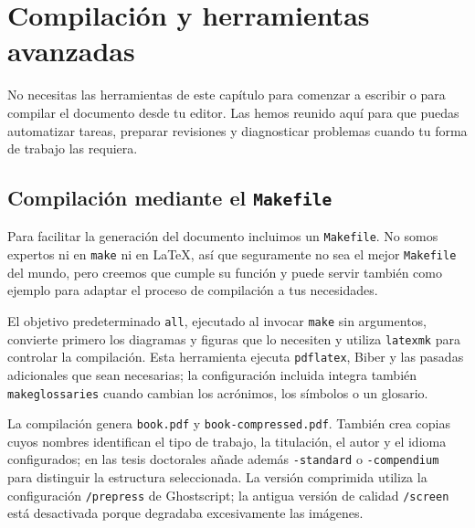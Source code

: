 %

\chapter{Compilación y herramientas avanzadas}
\label{cha:compilacion-avanzada}

No necesitas las herramientas de este capítulo para comenzar a escribir o para compilar el documento desde tu editor. Las hemos reunido aquí para que puedas automatizar tareas, preparar revisiones y diagnosticar problemas cuando tu forma de trabajo las requiera.

\section{Compilación mediante el \texttt{Makefile}}
\label{sec:compilacion-makefile}

Para facilitar la generación del documento incluimos un \texttt{Makefile}. No somos expertos ni en \texttt{make} ni en \LaTeX{}, así que seguramente no sea el mejor \texttt{Makefile} del mundo, pero creemos que cumple su función y puede servir también como ejemplo para adaptar el proceso de compilación a tus necesidades.

El objetivo predeterminado \texttt{all}, ejecutado al invocar \texttt{make} sin argumentos, convierte primero los diagramas y figuras que lo necesiten y utiliza \texttt{latexmk} para controlar la compilación. Esta herramienta ejecuta \texttt{pdflatex}, Biber y las pasadas adicionales que sean necesarias; la configuración incluida integra también \texttt{makeglossaries} cuando cambian los acrónimos, los símbolos o un glosario.

La compilación genera \texttt{book.pdf} y \texttt{book-compressed.pdf}. También crea copias cuyos nombres identifican el tipo de trabajo, la titulación, el autor y el idioma configurados; en las tesis doctorales añade además \texttt{-standard} o \texttt{-compendium} para distinguir la estructura seleccionada. La versión comprimida utiliza la configuración \texttt{/prepress} de Ghostscript; la antigua versión de calidad \texttt{/screen} está desactivada porque degradaba excesivamente las imágenes.

